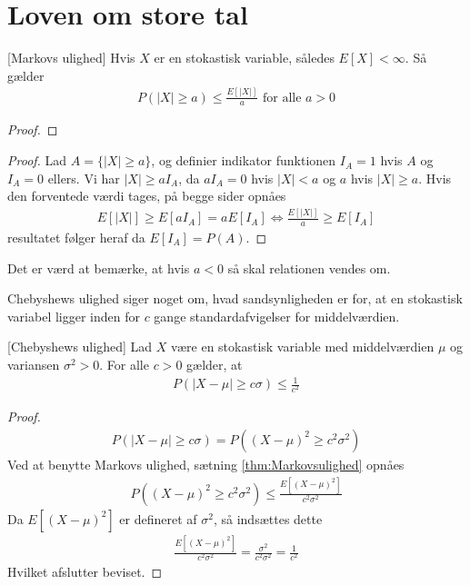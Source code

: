 \section{Loven om store tal}
\begin{theorem} \label{thm:Markovsulighed}[Markovs ulighed]
Hvis $X$ er en stokastisk variable, således
$E[X] < \infty$. Så gælder
\begin{align*}
    P(|X|\geq a) \leq \frac{E[|X|]}{a} \text{ for alle } a > 0
\end{align*}
\end{theorem}
\begin{proof}
\end{proof}
\begin{proof}
  Lad $A=\{|X|\geq a\}$, og definier indikator funktionen $I_A = 1$ hvis $A$ og $I_{A} = 0$ ellers. Vi har $|X| \geq aI_{A}$, da $aI_{A} = 0$ hvis $|X| < a$ og $a$ hvis $|X| \geq a$. Hvis den forventede værdi tages, på begge sider opnåes
  \begin{align*}
    E[|X|]\geq E[aI_A] = a E[I_A] \iff \frac{E[|X|]}{a}\geq E[I_A]
  \end{align*}
  resultatet følger heraf da $E[I_{A}] = P(A)$.
\end{proof}
Det er værd at bemærke, at hvis $a<0$ så skal relationen vendes om.

Chebyshews ulighed siger noget om, hvad sandsynligheden er for, at en stokastisk variabel ligger inden for $c$ gange standardafvigelser for middelværdien.
\begin{theorem} \label{Thm:Chebyshewsulighed}[Chebyshews ulighed]
    Lad $X$ være en stokastisk variable med middelværdien $\mu$ og variansen $\sigma^2>0$. For alle $c>0$ gælder, at
    \begin{align*}
        P(|X-\mu|\geq c \sigma)\leq \frac{1}{c^2}
    \end{align*}
\end{theorem}
\begin{proof}%
    \begin{align*}
        P(|X-\mu|\geq c \sigma)=P((X-\mu)^2\geq c^2\sigma^2)
    \end{align*}
Ved at benytte Markovs ulighed, sætning \ref{thm:Markovsulighed} opnåes
\begin{align*}
    P((X-\mu)^2\geq c^2\sigma^2) \leq \frac{E[(X-\mu)^2]}{c^2\sigma^2}
\end{align*}
Da $E[(X-\mu)^2]$ er defineret af $\sigma^2$, så indsættes dette
\begin{align*}
    \frac{E[(X-\mu)^2]}{c^2\sigma^2} = \frac{\sigma^2}{c^2\sigma^2} = \frac{1}{c^2}
\end{align*}
Hvilket afslutter beviset.
\end{proof}

